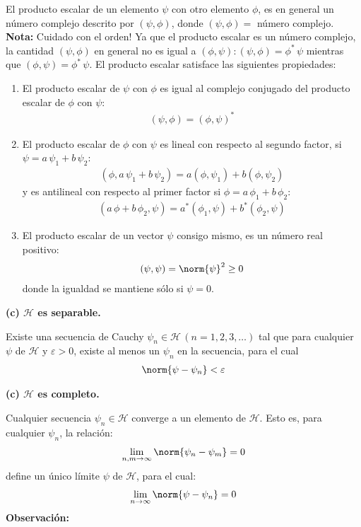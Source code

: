 El producto escalar de un elemento $\psi$ con otro elemento $\phi$, es en general un número complejo descrito por $(\psi, \phi)$, donde $(\psi, \phi) =$ número complejo. \textbf{Nota: } Cuidado con el orden! Ya que el producto escalar es un número complejo, la cantidad  $(\psi, \phi)$ en general no es igual a  $(\phi, \psi) : (\psi, \phi) = \phi^{*} \, \psi$ mientras que $(\phi, \psi) = \phi^{*} \, \psi$. El producto escalar satisface las siguientes propiedades:
\begin{enumerate}[label=\roman*)]
\item El producto escalar de $\psi$ con $\phi$ es igual al complejo conjugado del producto escalar de $\phi$ con $\psi$:
\begin{align}
(\psi, \phi) = (\phi, \psi)^{*}
\label{eq:ecuacion_02_04}
\end{align}
\item El producto escalar de $\phi$ con $\psi$ es lineal con respecto al segundo factor, si $\psi = a \, \psi_{1} + b \, \psi_{2}$:
\begin{align}
(\phi, a \, \psi_{1} + b \, \psi_{2} ) = a (\phi, \psi_{1}) + b (\phi, \psi_{2})
\label{eq:ecuacion_02_05}
\end{align}
y es antilineal con respecto al primer factor si $\phi = a \, \phi_{1} + b \, \phi_{2}$:
\begin{align}
(a \, \phi + b \, \phi_{2}, \psi) = a^{*} (\phi_{1}, \psi) + b^{*} (\phi_{2}, \psi)
\label{eq:ecuacion_02_06}
\end{align}
\item El producto escalar de un vector $\psi$ consigo mismo, es un número real positivo:
\begin{align}
(\psi, \psi) = \norm{\psi}^{2} \geq 0
\label{eq:ecuacion_02_07}
\end{align}
donde la igualdad se mantiene sólo si $\psi = 0$.
\end{enumerate}
\textbf{(c) $\mathcal{H}$ es separable.}

Existe una secuencia de Cauchy $\psi_{n} \in \mathcal{H} \, (n = 1, 2, 3, \ldots)$ tal que para cualquier $\psi$ de $\mathcal{H}$ y $\varepsilon > 0$, existe al menos un $\psi_{n}$ en la secuencia, para el cual
\begin{align}
\norm{ \psi - \psi_{n}} < \varepsilon
\label{eq:ecuacion_02_08}
\end{align}

\textbf{(c) $\mathcal{H}$ es completo.}

Cualquier secuencia $\psi_{n} \in \mathcal{H}$ converge a un elemento de $\mathcal{H}$. Esto es, para cualquier $\psi_{n}$, la relación:
\begin{align}
\lim_{n, m \to \infty} \norm{\psi_{n} - \psi_{m}} = 0
\label{eq:ecuacion_02_09}
\end{align}
define un único límite $\psi$ de $\mathcal{H}$, para el cual:
\begin{align}
\lim_{n \to \infty} \norm{\psi - \psi_{n}} = 0
\label{eq:ecuacion_02_10}
\end{align}
\textbf{Observación:}

